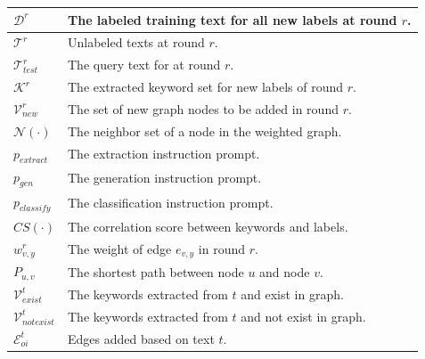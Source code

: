 \begin{table}[h]
{\begin{tabular}{l|p{7cm}}
			$\mathcal{D}^r$ & The labeled training text for all new labels at round $r$.  \\ \hline
			
			
			
			$	\mathcal{T}^r$ &	Unlabeled texts at round $r$. \\ 		\hline		
			
			
			$	\mathcal{T}_{test}^r$ & The query text for at round $r$.	\\ 		\hline	
			
			$	\mathcal{K}^r$ &	The extracted keyword set for new labels of round $r$.	\\ \hline					
			
			
			$	\mathcal{V}_{new}^r$ & The set of new graph nodes to be added in round $r$.	\\ 		\hline					
			$\mathcal{N}(\cdot)$& The neighbor set of a node in the weighted graph.	\\ 		\hline		
			
			$p_{extract}$&	The extraction instruction prompt.	\\ \hline					
			$p_{gen}$& The generation instruction prompt. 	\\ 	\hline		
			$p_{classify}$&The classification instruction prompt. 	\\ 	\hline		
			
			$CS(\cdot)$ &  	The correlation score between keywords and labels. \\ 		\hline			
			
			$w^r_{v,y}$&  The weight of edge $e_{v,y}$ in round $r$.	\\ 		\hline			
			$P_{u,v}$&  The shortest path between node $u$ and node $v$.	\\ 		\hline			
			$\mathcal{V}^t_{exist}$& The keywords extracted from $t$ and exist in graph.	\\ 		\hline		
			
			$\mathcal{V}^t_{notexist}$ & The keywords extracted from $t$ and not exist in graph.	\\ 		\hline		
			
			
			$\mathcal{E}_{oi}^t$ &  Edges added based on text $t$. \\ 
			\hline\hline
		\end{tabular}
	}
	
\end{table}



